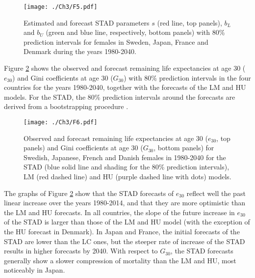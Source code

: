 \documentclass[Thesis]{subfiles}
\begin{document}
\begin{figure}[!ht]
	\begin{center}     
		\texttt{[image: ./Ch3/F5.pdf]} 
		\caption{Estimated and forecast STAD
			parameters $s$ (red line, top panels), $b_{L}$ and $b_{U}$ (green and blue line, respectively, bottom panels) with 80\% prediction intervals for females in Sweden, Japan, France and Denmark during the years 1980-2040.\label{Fig:ParametersEstFore}} 
	\end{center}  
\end{figure}

Figure \ref{Fig:LeFore} shows the observed and forecast remaining life expectancies at age 30 ($e_{30}$) and Gini coefficients at age 30 ($G_{30}$) with 80\% prediction intervals in the four countries for the years 1980-2040, together with the forecasts of the LM and HU models. For the STAD, the 80\% prediction intervals around the forecasts are derived from a bootstrapping procedure \citep{efron1994introduction}. 

\begin{figure}[!ht]
	\begin{center}
		
		\texttt{[image: ./Ch3/F6.pdf]}
		
		
		\caption{Observed and forecast remaining life expectancies at age 30 ($e_{30}$, top panels) and Gini coefficients at age 30 ($G_{30}$, bottom panels) for Swedish, Japanese, French and Danish females in 1980-2040 for the STAD (blue solid line and shading for the 80\% prediction intervals), LM (red dashed line) and HU (purple dashed line with dots) models.}\label{Fig:LeFore} 
		
	\end{center}
\end{figure}


The graphs of Figure \ref{Fig:LeFore} show that the STAD forecasts of $e_{30}$ reflect well the past linear increase over the years 1980-2014, and that they are more optimistic than the LM and HU forecasts. In all countries, the slope of the future increase in $e_{30}$ of the STAD is larger than those of the LM and HU model (with the exception of the HU forecast in Denmark). In Japan and France, the initial forecasts of the STAD are lower than the LC ones, but the steeper rate of increase of the STAD results in higher forecasts by 2040. With respect to $G_{30}$, the STAD forecasts generally show a slower compression of mortality than the LM and HU, most noticeably in Japan.
\end{document}
